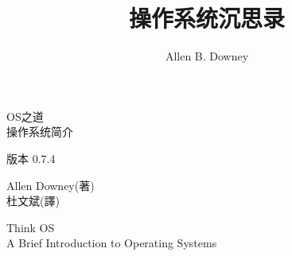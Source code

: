 \documentclass[12pt]{book}
\title{操作系统沉思录}
\author{Allen B. Downey}
\newcommand{\enthetitle}{Think OS}
\newcommand{\enthesubtitle}{A Brief Introduction to Operating Systems}
\newcommand{\thetitle}{OS之道}
\newcommand{\thesubtitle}{操作系统简介}
\newcommand{\theversion}{0.7.4}
\begin{document}
\frontmatter



  {\topsep}%
  {\topsep}%
  {}%
  {}%
  {\bfseries}%
  {}%
  { }%
  {}%

\theoremstyle{exercise}
\newtheorem{exercise}{Exercise}[chapter]



\begin{latexonly}

\renewcommand{\topfraction}{0.9}
\renewcommand{\blankpage}{\thispagestyle{empty} \quad \newpage}


\thispagestyle{empty}

\begin{flushright}
\vspace*{2.0in}

\begin{spacing}{3}
{\huge \thetitle}\\
{\Large \thesubtitle}
\end{spacing}

\vspace{0.25in}

版本 \theversion

\vspace{1in}

{\Large
	Allen Downey(著)\\
}
{\small 杜文斌(譯)}


\vfill

\end{flushright}


\blankpage
\blankpage

\pagebreak
\thispagestyle{empty}

\begin{flushright}
\vspace*{2.0in}

\begin{spacing}{3}
{\huge \enthetitle}\\
{\Large \enthesubtitle}
\end{spacing}


\end{flushright}
\end{latexonly}
\end{document}
